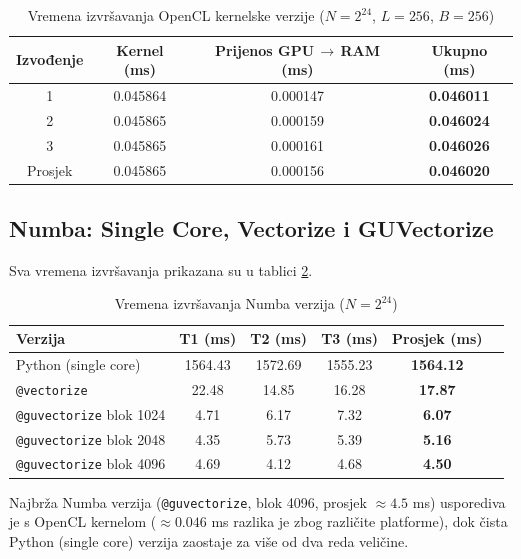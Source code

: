 \documentclass[12pt,a4paper]{article}
\begin{document}
\begin{table}[ht]
\centering
\caption{Vremena izvršavanja OpenCL kernelske verzije ($N = 2^{24}$,
         $L = 256$, $B = 256$)}
\label{tab:gpu32}
\vspace{0.3cm}
\begin{tabular}{cccc}
\toprule
\textbf{Izvođenje} & \textbf{Kernel (ms)} &
\textbf{Prijenos GPU\,$\to$\,RAM (ms)} & \textbf{Ukupno (ms)} \\
\midrule
1 & 0.045864 & 0.000147 & \textbf{0.046011} \\
2 & 0.045865 & 0.000159 & \textbf{0.046024} \\
3 & 0.045865 & 0.000161 & \textbf{0.046026} \\
\midrule
Prosjek & 0.045865 & 0.000156 & \textbf{0.046020} \\
\bottomrule
\end{tabular}
\end{table}

\subsection{Numba: Single Core, Vectorize i GUVectorize}

Sva vremena izvršavanja prikazana su u tablici \ref{tab:numba32}.

\begin{table}[ht]
\centering
\caption{Vremena izvršavanja Numba verzija ($N = 2^{24}$)}
\label{tab:numba32}
\vspace{0.3cm}
\begin{tabular}{lccccc}
\toprule
\textbf{Verzija} &
\textbf{T1 (ms)} & \textbf{T2 (ms)} &
\textbf{T3 (ms)} & \textbf{Prosjek (ms)} \\
\midrule
Python (single core) & 1564.43 & 1572.69 & 1555.23 & \textbf{1564.12} \\
\texttt{@vectorize} & 22.48 & 14.85 & 16.28 & \textbf{17.87} \\
\midrule
\texttt{@guvectorize} blok 1024 & 4.71 & 6.17 & 7.32 & \textbf{6.07} \\
\texttt{@guvectorize} blok 2048 & 4.35 & 5.73 & 5.39 & \textbf{5.16} \\
\texttt{@guvectorize} blok 4096 & 4.69 & 4.12 & 4.68 & \textbf{4.50} \\
\bottomrule
\end{tabular}
\end{table}

\noindent Najbrža Numba verzija (\texttt{@guvectorize}, blok 4096,
prosjek $\approx 4.5$ ms) usporediva je s OpenCL kernelom ($\approx
0.046$ ms razlika je zbog različite platforme), dok čista Python (single core) verzija
zaostaje za više od dva reda veličine.
\end{document}
